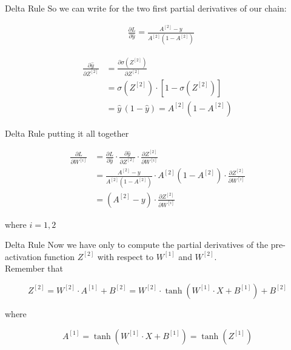 \documentclass[11pt]{beamer}
\begin{document}
\begin{frame}{Delta Rule}
So we can write for the two first partial derivatives of our chain:

\begin{align*}
&\frac{\partial L}{\partial \hat y} =  \frac{A^{[2]} - y}{A^{[2]}\left(1 - A^{[2]}\right)}
\end{align*}

\begin{align*}
\frac{\partial \hat y}{\partial Z^{[2]}} &= \frac{\partial \sigma\left( Z^{[2]} \right)}{\partial Z^{[2]}} \\
&= \sigma\left(Z^{[2]}\right) \cdot \left[1 - \sigma\left(Z^{[2]}\right)\right]\\
&= {\hat y}\, (1 - \hat y) = A^{[2]} \left( 1 - A^{[2]} \right)
\end{align*}
\end{frame}
\begin{frame}{Delta Rule}
putting it all together

\begin{align*}
\frac{\partial L}{\partial W^{[i]}} 
& = \frac{\partial L}{\partial \hat y} \cdot \frac{\partial \hat y}{\partial Z^{[2]}} \cdot \frac{\partial Z^{[2]}}{\partial W^{[i]}} \\
& = \frac{A^{[2]} - y}{A^{[2]}\left(1 - A^{[2]}\right)} \cdot A^{[2]} \left( 1 - A^{[2]} \right) \cdot  \frac{\partial Z^{[2]}}{\partial W^{[i]}} \\
& = \left( A^{[2]} - y \right) \cdot \frac{\partial Z^{[2]}}{\partial W^{[i]}}
\end{align*}

where $i=1,2$
\end{frame}
\begin{frame}{Delta Rule}
Now we have only to compute the partial derivatives of the pre-activation function $Z^{[2]}$ with respect to $W^{[1]}$ and $W^{[2]}$. \\

Remember that 

$$Z^{[2]} = W^{[2]} \cdot A^{[1]}  + B^{[2]} = W^{[2]} \cdot \tanh\left( W^{[1]} \cdot X + B^{[1]} \right) + B^{[2]}$$

where

$$A^{[1]} = \tanh\left( W^{[1]} \cdot X + B^{[1]}\right) = \tanh\left( Z^{[1]} \right)$$

\end{frame}
\end{document}
